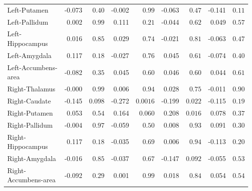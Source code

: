 \begin{tabular}{lrrrrrrrr}
Left-Putamen & -0.073 & $0.40$ & -0.002 & $0.99$ & -0.063 & $0.47$ & -0.141 & $0.11$ \\
Left-Pallidum & 0.002 & $0.99$ & 0.111 & $0.21$ & -0.044 & $0.62$ & 0.049 & $0.57$ \\
Left-Hippocampus & 0.016 & $0.85$ & 0.029 & $0.74$ & -0.021 & $0.81$ & -0.063 & $0.47$ \\
Left-Amygdala & 0.117 & $0.18$ & -0.027 & $0.76$ & 0.045 & $0.61$ & -0.074 & $0.40$ \\
Left-Accumbens-area & -0.082 & $0.35$ & 0.045 & $0.60$ & 0.046 & $0.60$ & 0.044 & $0.61$ \\
Right-Thalamus & -0.000 & $0.99$ & 0.006 & $0.94$ & 0.028 & $0.75$ & -0.011 & $0.90$ \\
Right-Caudate & -0.145 & $0.098$ & -0.272 & $\mathbf{0.0016}$ & -0.199 & $0.022$ & -0.115 & $0.19$ \\
Right-Putamen & 0.053 & $0.54$ & 0.164 & $0.060$ & 0.208 & $0.016$ & 0.078 & $0.37$ \\
Right-Pallidum & -0.004 & $0.97$ & -0.059 & $0.50$ & 0.008 & $0.93$ & 0.091 & $0.30$ \\
Right-Hippocampus & 0.117 & $0.18$ & -0.035 & $0.69$ & 0.006 & $0.94$ & -0.113 & $0.20$ \\
Right-Amygdala & -0.016 & $0.85$ & -0.037 & $0.67$ & -0.147 & $0.092$ & -0.055 & $0.53$ \\
Right-Accumbens-area & -0.092 & $0.29$ & 0.001 & $0.99$ & 0.018 & $0.84$ & 0.054 & $0.54$ \\
\bottomrule
\end{tabular}
